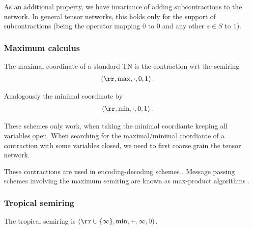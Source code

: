 As an additional property, we have invariance of adding subcontractions to the network.
In general tensor networks, this holds only for the support of subcontractions (being the operator mapping $0$ to $0$ and any other $s\in S$ to $1$).

\subsubsection{Maximum calculus}

The maximal coordinate of a standard TN is the contraction wrt the semiring
\begin{align*}
(\rr,\mathrm{max},\cdot,0,1)
    \, .
\end{align*}

Analogously the minimal coordinate by
\begin{align*}
(\rr,\mathrm{min},\cdot,0,1)
    \, .
\end{align*}


These schemes only work, when taking the minimal coordiante keeping all variables open.
When searching for the maximal/minimal coordiante of a contraction with some variables closed, we need to first coarse grain the tensor network.

These contractions are used in encoding-decoding schemes \cite{mezard_information_2009,mackay_information_2003}.
Message passing schemes involving the maximum semiring are known as max-product algorithms \cite{koller_probabilistic_2009}.

\subsubsection{Tropical semiring}

The tropical semiring \cite{liu_tropical_2021} is $(\rr\cup\{\infty\},\mathrm{min},+,\infty,0)$.